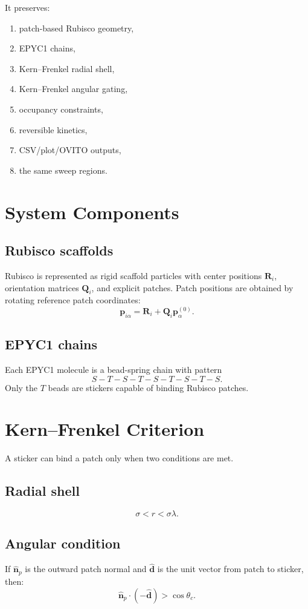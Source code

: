 \documentclass[11pt]{article}
\begin{document}
It preserves:
\begin{enumerate}[label=\arabic*.]
    \item patch-based Rubisco geometry,
    \item EPYC1 chains,
    \item Kern--Frenkel radial shell,
    \item Kern--Frenkel angular gating,
    \item occupancy constraints,
    \item reversible kinetics,
    \item CSV/plot/OVITO outputs,
    \item the same sweep regions.
\end{enumerate}

\section{System Components}
\subsection{Rubisco scaffolds}
Rubisco is represented as rigid scaffold particles with center positions $\mathbf{R}_i$, orientation matrices $\mathbf{Q}_i$, and explicit patches. Patch positions are obtained by rotating reference patch coordinates:
\[
\mathbf{p}_{i\alpha} = \mathbf{R}_i + \mathbf{Q}_i \mathbf{p}^{(0)}_{\alpha}.
\]

\subsection{EPYC1 chains}
Each EPYC1 molecule is a bead-spring chain with pattern
\[
S-T-S-T-S-T-S-T-S.
\]
Only the $T$ beads are stickers capable of binding Rubisco patches.

\section{Kern--Frenkel Criterion}
A sticker can bind a patch only when two conditions are met.

\subsection{Radial shell}
\[
\sigma < r < \sigma \lambda.
\]

\subsection{Angular condition}
If $\hat{\mathbf{n}}_p$ is the outward patch normal and $\hat{\mathbf{d}}$ is the unit vector from patch to sticker, then:
\[
\hat{\mathbf{n}}_p \cdot (-\hat{\mathbf{d}}) > \cos\theta_c.
\]
\end{document}
